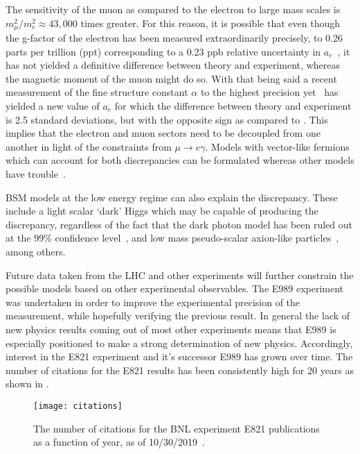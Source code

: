 The sensitivity of the muon as compared to the electron to large mass scales is $ m_{\mu}^{2} / m_{e}^{2} \approx 43,000$ times greater. For this reason, it is possible that even though the g-factor of the electron has been measured extraordinarily precisely, to 0.26 parts per trillion (ppt) corresponding to a 0.23 ppb relative uncertainty in $a_{e}$~\cite{CODATA,ElectronMDM}, it has not yielded a definitive difference between theory and experiment, whereas the magnetic moment of the muon might do so. With that being said a recent measurement of the fine structure constant $\alpha$ to the highest precision yet~\cite{finestructureBerkeley} has yielded a new value of $a_{e}$ for which the difference between theory and experiment is 2.5 standard deviations, but with the opposite sign as compared to \amu. This implies that the electron and muon sectors need to be decoupled from one another in light of the constraints from $\mu \rightarrow e\gamma$. Models with vector-like fermions which can account for both discrepancies can be formulated whereas other models have trouble~\cite{PhysRevD.98.113002}.



BSM models at the low energy regime can also explain the discrepancy. These include a light scalar `dark' Higgs which may be capable of producing the discrepancy, regardless of the fact that the dark photon model has been ruled out at the 99\% confidence level~\cite{Chen:2015vqy,Ablikim:2017aab}, and low mass pseudo-scalar axion-like particles~\cite{Marciano_2016}, among others.



Future data taken from the LHC and other experiments will further constrain the possible models based on other experimental observables. The E989 experiment was undertaken in order to improve the experimental precision of the \amu measurement, while hopefully verifying the previous result. In general the lack of new physics results coming out of most other experiments means that E989 is especially positioned to make a strong determination of new physics. Accordingly, interest in the E821 experiment and it's successor E989 has grown over time. The number of citations for the E821 results has been consistently high for 20 years as shown in .



\begin{figure}
	\centering
	\texttt{[image: citations]}
	\caption[Citations for E821 publications vs year]{The number of citations for the BNL experiment E821 publications as a function of year, as of 10/30/2019~\cite{MarkComm}.}
	\label{fig:E821Citations}
\end{figure}


